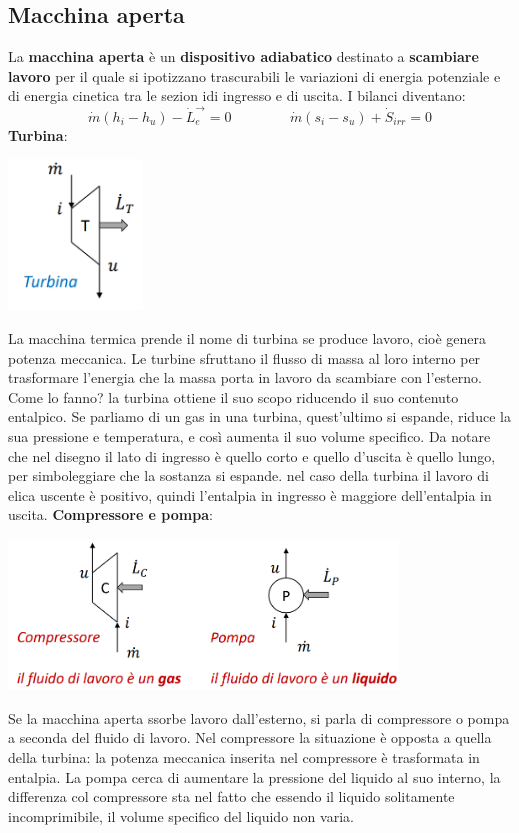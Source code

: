 \subsection{Macchina aperta}
La \textbf{macchina aperta} è un \textbf{dispositivo adiabatico} destinato a \textbf{scambiare lavoro} per il quale si ipotizzano trascurabili le variazioni di energia potenziale e di energia cinetica tra le sezion idi ingresso e di uscita.\newline
\newline
I bilanci diventano:
\[
    \dot{m}(h_i - h_u) - \dot{L}_e^\rightarrow  = 0 \;\;\;\;\;\;\;\;\;\;\;\;\;\;\; \dot{m} (s_i - s_u) + \dot{S}_{irr} = 0
\]
\textbf{Turbina}:
\begin{center}
    \includegraphics[height=4cm]{../L06/img3.PNG}
\end{center}
La macchina termica prende il nome di turbina se produce lavoro, cioè genera potenza meccanica. Le turbine sfruttano il flusso di massa al loro interno per trasformare l'energia che la massa porta in lavoro da scambiare con l'esterno. Come lo fanno? la turbina ottiene il suo scopo riducendo il suo contenuto entalpico. Se parliamo di un gas in una turbina, quest'ultimo si espande, riduce la sua pressione e temperatura, e così aumenta il suo volume specifico. Da notare che nel disegno il lato di ingresso è quello corto e quello d'uscita è quello lungo, per simboleggiare che la sostanza si espande. nel caso della turbina il lavoro di elica uscente è positivo, quindi l'entalpia in ingresso è maggiore dell'entalpia in uscita.\newline
\newline
\textbf{Compressore e pompa}:
\begin{center}
    \includegraphics[height=4cm]{../L06/img4.PNG}
\end{center}
Se la macchina aperta ssorbe lavoro dall'esterno, si parla di compressore o pompa a seconda del fluido di lavoro. Nel compressore la situazione è opposta a quella della turbina: la potenza meccanica inserita nel compressore è trasformata in entalpia. La pompa cerca di aumentare la pressione del liquido al suo interno, la differenza col compressore sta nel fatto che essendo il liquido solitamente incomprimibile, il volume specifico del liquido non varia.
